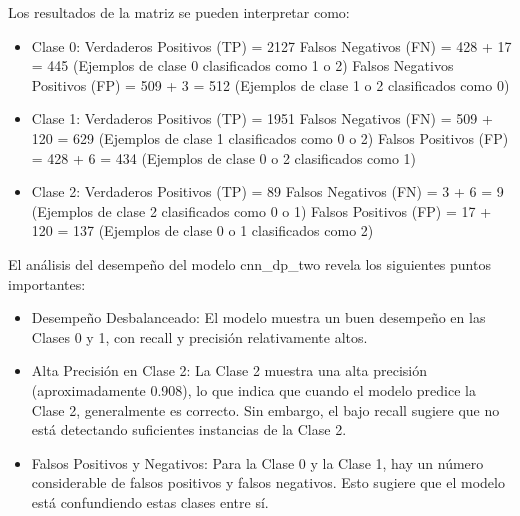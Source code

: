 Los resultados de la matriz se pueden interpretar como:

\begin{itemize}

\item Clase 0:
Verdaderos Positivos (TP) = 2127
Falsos Negativos  (FN) = 428 + 17 = 445 (Ejemplos de clase 0 clasificados como 1 o 2)
Falsos Negativos Positivos (FP) = 509 + 3 = 512 (Ejemplos de clase 1 o 2 clasificados como 0)


\item Clase 1:
Verdaderos Positivos (TP) = 1951
Falsos Negativos (FN) = 509 + 120 = 629 (Ejemplos de clase 1 clasificados como 0 o 2)
Falsos Positivos (FP) = 428 + 6 = 434 (Ejemplos de clase 0 o 2 clasificados como 1)

\item Clase 2:
Verdaderos Positivos (TP) = 89
Falsos Negativos (FN) = 3 + 6 = 9 (Ejemplos de clase 2 clasificados como 0 o 1)
Falsos Positivos (FP) = 17 + 120 = 137 (Ejemplos de clase 0 o 1 clasificados como 2)

\end{itemize}


El análisis del desempeño del modelo cnn\_dp\_two revela los siguientes puntos importantes:

\begin{itemize}

\item Desempeño Desbalanceado:
El modelo muestra un buen desempeño en las Clases 0 y 1, con recall y precisión relativamente altos. 

\item Alta Precisión en Clase 2:
La Clase 2 muestra una alta precisión (aproximadamente 0.908), lo que indica que cuando el modelo predice la Clase 2, generalmente es correcto. Sin embargo, el bajo recall sugiere que no está detectando suficientes instancias de la Clase 2.

\item Falsos Positivos y Negativos:
Para la Clase 0 y la Clase 1, hay un número considerable de falsos positivos y falsos negativos. Esto sugiere que el modelo está confundiendo estas clases entre sí.


\end{itemize}

